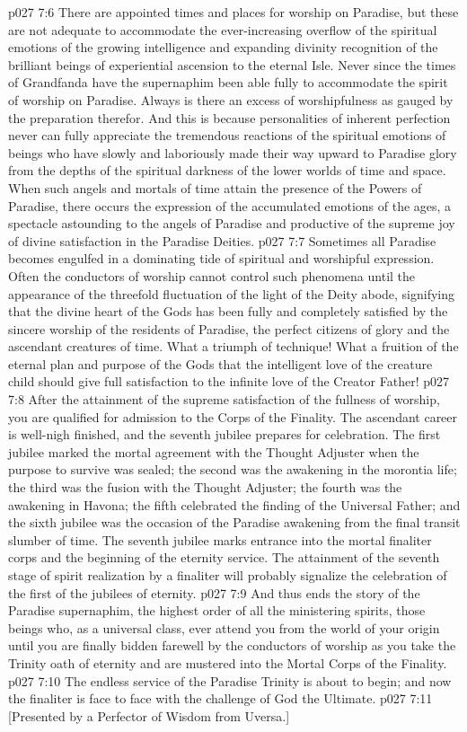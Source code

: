 \vs p027 7:6 There are appointed times and places for worship on Paradise, but these are not adequate to accommodate the ever\hyp{}increasing overflow of the spiritual emotions of the growing intelligence and expanding divinity recognition of the brilliant beings of experiential ascension to the eternal Isle. Never since the times of Grandfanda have the supernaphim been able fully to accommodate the spirit of worship on Paradise. Always is there an excess of worshipfulness as gauged by the preparation therefor. And this is because personalities of inherent perfection never can fully appreciate the tremendous reactions of the spiritual emotions of beings who have slowly and laboriously made their way upward to Paradise glory from the depths of the spiritual darkness of the lower worlds of time and space. When such angels and mortals of time attain the presence of the Powers of Paradise, there occurs the expression of the accumulated emotions of the ages, a spectacle astounding to the angels of Paradise and productive of the supreme joy of divine satisfaction in the Paradise Deities.
\vs p027 7:7 Sometimes all Paradise becomes engulfed in a dominating tide of spiritual and worshipful expression. Often the conductors of worship cannot control such phenomena until the appearance of the threefold fluctuation of the light of the Deity abode, signifying that the divine heart of the Gods has been fully and completely satisfied by the sincere worship of the residents of Paradise, the perfect citizens of glory and the ascendant creatures of time. What a triumph of technique! What a fruition of the eternal plan and purpose of the Gods that the intelligent love of the creature child should give full satisfaction to the infinite love of the Creator Father!
\vs p027 7:8 \pc After the attainment of the supreme satisfaction of the fullness of worship, you are qualified for admission to the Corps of the Finality. The ascendant career is well\hyp{}nigh finished, and the seventh jubilee prepares for celebration. The first jubilee marked the mortal agreement with the Thought Adjuster when the purpose to survive was sealed; the second was the awakening in the morontia life; the third was the fusion with the Thought Adjuster; the fourth was the awakening in Havona; the fifth celebrated the finding of the Universal Father; and the sixth jubilee was the occasion of the Paradise awakening from the final transit slumber of time. The seventh jubilee marks entrance into the mortal finaliter corps and the beginning of the eternity service. The attainment of the seventh stage of spirit realization by a finaliter will probably signalize the celebration of the first of the jubilees of eternity.
\vs p027 7:9 \pc And thus ends the story of the Paradise supernaphim, the highest order of all the ministering spirits, those beings who, as a universal class, ever attend you from the world of your origin until you are finally bidden farewell by the conductors of worship as you take the Trinity oath of eternity and are mustered into the Mortal Corps of the Finality.
\vs p027 7:10 The endless service of the Paradise Trinity is about to begin; and now the finaliter is face to face with the challenge of God the Ultimate.
\vsetoff
\vs p027 7:11 [Presented by a Perfector of Wisdom from Uversa.]
\quizlink
